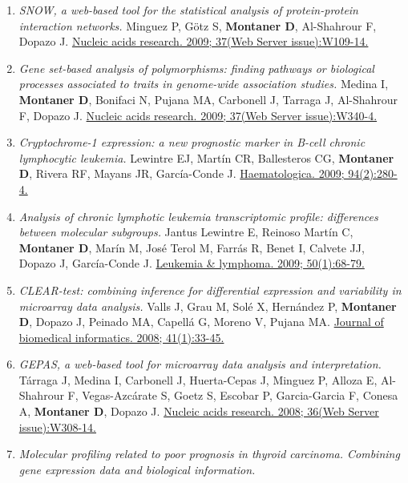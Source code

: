 \begin{enumerate}
{  profiling.} \textbf{Montaner D}, Minguez P, Al-Shahrour F, Dopazo J.
  \href{http://www.ncbi.nlm.nih.gov//pubmed/19397819}{BMC genomics.
  2009; 10:197.}
\item
  \emph{SNOW, a web-based tool for the statistical analysis of
  protein-protein interaction networks.} Minguez P, Götz S,
  \textbf{Montaner D}, Al-Shahrour F, Dopazo J.
  \href{http://www.ncbi.nlm.nih.gov//pubmed/19454602}{Nucleic acids
  research. 2009; 37(Web Server issue):W109-14.}
\item
  \emph{Gene set-based analysis of polymorphisms: finding pathways or
  biological processes associated to traits in genome-wide association
  studies.} Medina I, \textbf{Montaner D}, Bonifaci N, Pujana MA,
  Carbonell J, Tarraga J, Al-Shahrour F, Dopazo J.
  \href{http://www.ncbi.nlm.nih.gov//pubmed/19502494}{Nucleic acids
  research. 2009; 37(Web Server issue):W340-4.}
\item
  \emph{Cryptochrome-1 expression: a new prognostic marker in B-cell
  chronic lymphocytic leukemia.} Lewintre EJ, Martín CR, Ballesteros CG,
  \textbf{Montaner D}, Rivera RF, Mayans JR, García-Conde J.
  \href{http://www.ncbi.nlm.nih.gov//pubmed/19181792}{Haematologica.
  2009; 94(2):280-4.}
\item
  \emph{Analysis of chronic lymphotic leukemia transcriptomic profile:
  differences between molecular subgroups.} Jantus Lewintre E, Reinoso
  Martín C, \textbf{Montaner D}, Marín M, José Terol M, Farrás R, Benet
  I, Calvete JJ, Dopazo J, García-Conde J.
  \href{http://www.ncbi.nlm.nih.gov//pubmed/19127482}{Leukemia \&
  lymphoma. 2009; 50(1):68-79.}
\item
  \emph{CLEAR-test: combining inference for differential expression and
  variability in microarray data analysis.} Valls J, Grau M, Solé X,
  Hernández P, \textbf{Montaner D}, Dopazo J, Peinado MA, Capellá G,
  Moreno V, Pujana MA.
  \href{http://www.ncbi.nlm.nih.gov//pubmed/17597009}{Journal of
  biomedical informatics. 2008; 41(1):33-45.}
\item
  \emph{GEPAS, a web-based tool for microarray data analysis and
  interpretation.} Tárraga J, Medina I, Carbonell J, Huerta-Cepas J,
  Minguez P, Alloza E, Al-Shahrour F, Vegas-Azcárate S, Goetz S, Escobar
  P, Garcia-Garcia F, Conesa A, \textbf{Montaner D}, Dopazo J.
  \href{http://www.ncbi.nlm.nih.gov//pubmed/18508806}{Nucleic acids
  research. 2008; 36(Web Server issue):W308-14.}
\item
  \emph{Molecular profiling related to poor prognosis in thyroid
  carcinoma. Combining gene expression data and biological information.}

\end{enumerate}
